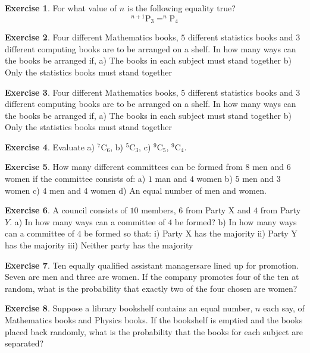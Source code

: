 \documentclass[
]{book}
\theoremstyle{definition}
\theoremstyle{definition}
\theoremstyle{definition}
\newtheorem{exercise}{Exercise}[chapter]
\theoremstyle{definition}
\theoremstyle{remark}
\begin{document}
\begin{exercise}
For what value of \(n\) is the following equality true?
\[ ^{n+1}\text{P}_3 = ^n\text{P}_4 \]
\end{exercise}

\begin{exercise}
Four different Mathematics books, \(5\) different statistics books and \(3\) different computing books are to be arranged on a shelf. In how many ways can the books be arranged if,
a) The books in each subject must stand together
b) Only the statistics books must stand together
\end{exercise}

\begin{exercise}
Four different Mathematics books, \(5\) different statistics books and \(3\) different computing books are to be arranged on a shelf. In how many ways can the books be arranged if,
a) The books in each subject must stand together
b) Only the statistics books must stand together
\end{exercise}

\begin{exercise}
Evaluate a) \(^7\text{C}_6\), b) \(^5\text{C}_3\), c) \(^9\text{C}_5\), \(^9\text{C}_4\).
\end{exercise}

\begin{exercise}
How many different committees can be formed from \(8\) men and \(6\) women if the committee consists of:
a) \(1\) man and \(4\) women
b) \(5\) men and \(3\) women
c) \(4\) men and \(4\) women
d) An equal number of men and women.
\end{exercise}

\begin{exercise}
A council consists of \(10\) members, \(6\) from Party X and \(4\) from Party \(Y\).
a) In how many ways can a committee of \(4\) be formed?
b) In how many ways can a committee of \(4\) be formed so that:
i) Party X has the majority
ii) Party Y has the majority
iii) Neither party has the majority
\end{exercise}

\begin{exercise}
Ten equally qualified assistant managersare lined up for promotion. Seven are men and three are women. If the company promotes four of the ten at random, what is the probability that exactly two of the four chosen are women?
\end{exercise}

\begin{exercise}
Suppose a library bookshelf contains an equal number, \(n\) each say, of Mathematics books and Physics books. If the bookshelf is emptied and the books placed back randomly, what is the probability that the books for each subject are separated?
\end{exercise}
\end{document}

